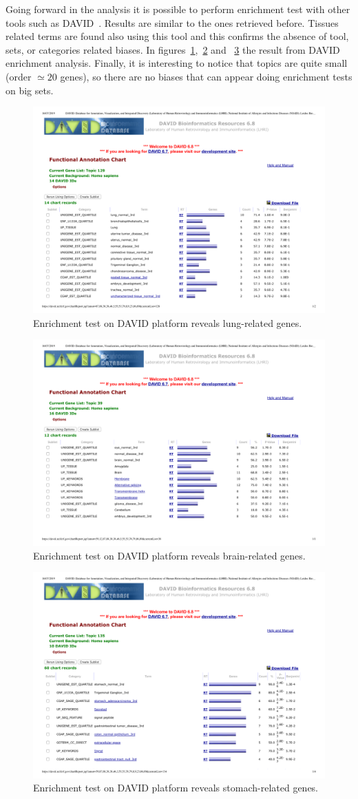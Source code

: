 Going forward in the analysis it is possible to perform enrichment test with other tools such as DAVID~\cite{huang2008bioinformatics,huang2009systematic}. Results are similar to the ones retrieved before. Tissues related terms are found also using this tool and this confirms the absence of tool, sets, or categories related biases. In figures~\ref{fig:topic/merged/DAVID_lung},~\ref{fig:topic/merged/DAVID_brain} and ~\ref{fig:topic/merged/DAVID_stomach} the result from DAVID enrichment analysis. Finally, it is interesting to notice that topics are quite small (order $\simeq20$ genes), so there are no biases that can appear doing enrichment tests on big sets.
\begin{figure}[htb!]
    \centering
    \includegraphics[width=0.6\linewidth]{pictures/topic/merged/DAVID_lung.pdf}
    \caption{Enrichment test on DAVID platform reveals lung-related genes.}
    \label{fig:topic/merged/DAVID_lung}
\end{figure}
\begin{figure}[htb!]
    \centering
    \includegraphics[width=0.6\linewidth]{pictures/topic/merged/DAVID_brain.pdf}
    \caption{Enrichment test on DAVID platform reveals brain-related genes.}
    \label{fig:topic/merged/DAVID_brain}
\end{figure}
\begin{figure}[htb!]
    \centering
    \includegraphics[width=0.6\linewidth]{pictures/topic/merged/DAVID_stomach.pdf}
    \caption{Enrichment test on DAVID platform reveals stomach-related genes.}
    \label{fig:topic/merged/DAVID_stomach}
\end{figure}

